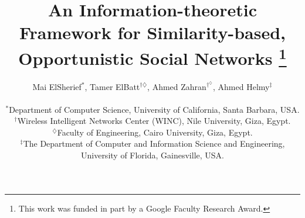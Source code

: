 \documentclass[12pt,epsf]{article}
\date{}
\theoremstyle{definition}
\begin{document}
\title{{\fontsize{20}{20}\selectfont An Information-theoretic Framework for Similarity-based, Opportunistic Social Networks} \thanks{This work was funded in part by a Google Faculty Research Award.}}


\author{\large Mai ElSherief$^*$, Tamer ElBatt$^{\dagger\diamondsuit}$, Ahmed Zahran$^{\dagger^\diamondsuit}$, Ahmed Helmy$^{\ddagger}$  \\ [.1in]
\small  \begin{tabular}{c} 
$^*$Department of Computer Science, University of California, Santa Barbara, USA.\\
$^\dagger$Wireless Intelligent Networks Center (WINC), Nile University, Giza, Egypt.\\
$^\diamondsuit$Faculty of Engineering, Cairo University, Giza, Egypt.\\
$^\ddagger$The Department of Computer and Information Science and Engineering,
University of Florida, Gainesville, USA. \\
\end{tabular} }

\maketitle
\end{document}
